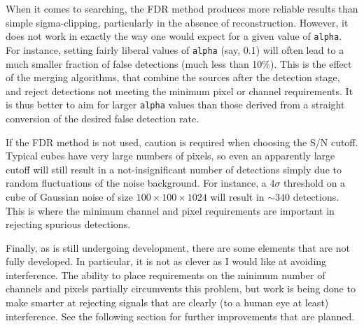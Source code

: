 When it comes to searching, the FDR method produces more reliable
results than simple sigma-clipping, particularly in the absence of
reconstruction.  However, it does not work in exactly the way one
would expect for a given value of \texttt{alpha}. For instance,
setting fairly liberal values of \texttt{alpha} (say, 0.1) will often
lead to a much smaller fraction of false detections (\ie much less
than 10\%). This is the effect of the merging algorithms, that combine
the sources after the detection stage, and reject detections not
meeting the minimum pixel or channel requirements.  It is thus better
to aim for larger \texttt{alpha} values than those derived from a
straight conversion of the desired false detection rate.

If the FDR method is not used, caution is required when choosing the
S/N cutoff. Typical cubes have very large numbers of pixels, so even
an apparently large cutoff will still result in a not-insignificant
number of detections simply due to random fluctuations of the noise
background. For instance, a $4\sigma$ threshold on a cube of Gaussian
noise of size $100\times100\times1024$ will result in $\sim340$
detections. This is where the minimum channel and pixel requirements
are important in rejecting spurious detections.

Finally, as \duchamp is still undergoing development, there are some
elements that are not fully developed. In particular, it is not as
clever as I would like at avoiding interference. The ability to place
requirements on the minimum number of channels and pixels partially
circumvents this problem, but work is being done to make \duchamp
smarter at rejecting signals that are clearly (to a human eye at
least) interference. See the following section for further
improvements that are planned.
